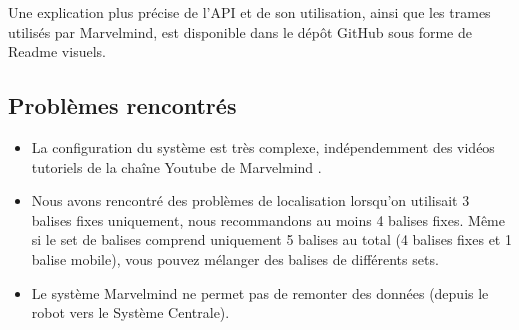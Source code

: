Une explication plus précise de l'API et de son utilisation, ainsi que les trames utilisés par Marvelmind, est disponible dans le dépôt GitHub sous forme de Readme visuels. 
\subsection{Problèmes rencontrés}
\begin{itemize}
    \item La configuration du système est très complexe, indépendemment des vidéos tutoriels de la chaîne Youtube de Marvelmind \cite{marvelmind-youtube}. 
    \item Nous avons rencontré des problèmes de localisation lorsqu'on utilisait 3 balises fixes uniquement, nous recommandons au moins 4 balises fixes. Même si le set de balises comprend uniquement 5 balises au total (4 balises fixes et 1 balise mobile), vous pouvez mélanger des balises de différents sets. 
    \item Le système Marvelmind ne permet pas de remonter des données (depuis le robot vers le Système Centrale).
\end{itemize}